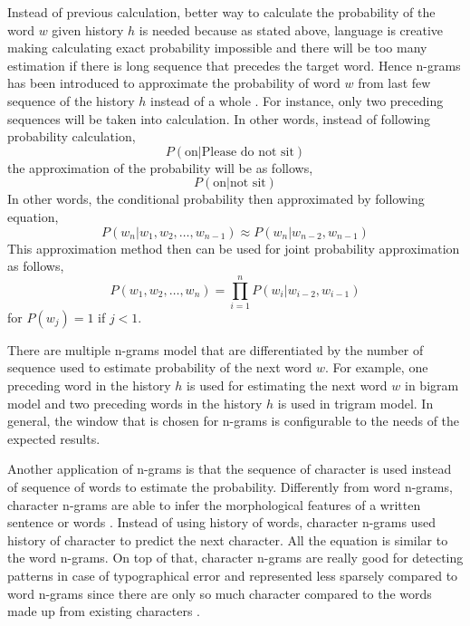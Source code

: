     Instead of previous calculation, better way to calculate the probability of the word
    $w$ given history $h$ is needed because as stated above, language
    is creative making calculating exact probability impossible and
    there will be too many estimation if there is long sequence that
    precedes the target word. Hence n-grams has been introduced to
    approximate the probability of word $w$ from last few sequence of
    the history $h$ instead of a whole
    \citep{speech2009Jurafsky}. For instance, only
    two preceding sequences will be taken into calculation.
    In other words, instead of following probability calculation,
    \begin{equation}
        P(\text{on} \vert \text{Please do not sit})
    \end{equation}
    the approximation of the probability will be as follows,
    \begin{equation}
        P(\text{on} \vert \text{not sit})
    \end{equation}
    In other words, the conditional probability then approximated by
    following equation,
    \begin{equation}
        \label{eq:condprobapprox}
        P(w_n \vert w_1, w_2, \dots, w_{n-1}) \approx P(w_n \vert w_{n-2}, w_{n-1})
    \end{equation}
    This approximation method then can be used for joint probability
    approximation as follows,
    \begin{equation}
        P(w_1, w_2, \dots, w_n) = \prod_{i=1}^n P(w_i \vert w_{i-2}, w_{i-1})
    \end{equation}
    for $P(w_j) = 1$ if $j < 1$.

    There are multiple n-grams model that are differentiated by the number
    of sequence used to estimate probability of the next word $w$. For
    example, one preceding word in the history $h$ is used for estimating
    the next word $w$ in bigram model and two preceding words in the
    history $h$ is used in trigram model. In general, the window that is chosen
    for n-grams is configurable to the needs of the expected results.
    
    Another application of n-grams is that the sequence of character
    is used instead of sequence of words to estimate the probability.
    Differently from word n-grams, character n-grams are able to infer
    the morphological features of a written sentence or words
    \citep{kulmizev-etal-2017-power}. Instead of using history of
    words, character n-grams used history of character to predict the
    next character. All the equation is similar to the word n-grams. On
    top of that, character n-grams are really good for detecting
    patterns in case of typographical error and represented less
    sparsely compared to word n-grams since there are only so much
    character compared to the words made up from existing characters
    \citep{kulmizev-etal-2017-power}.